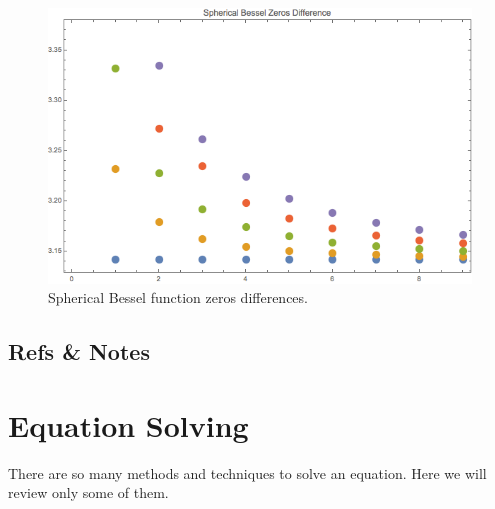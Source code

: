 \documentclass[letterpaper,10pt,english]{sphinxmanual}
\begin{document}
\begin{figure}[htbp]
\centering
\capstart

\includegraphics{sphbesselZerosDifferencePlt.png}
\caption{Spherical Bessel function zeros differences.}\end{figure}


\subsection{Refs \& Notes}
\label{special-functions:refs-notes}

\section{Equation Solving}
\label{equation-solving::doc}\label{equation-solving:equation-solving}
There are so many methods and techniques to solve an equation. Here we will review only some of them.
\end{document}

